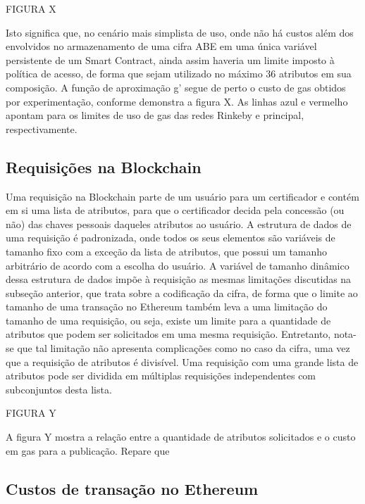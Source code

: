 \documentclass[a4paper,11pt]{article}
\begin{document}
FIGURA X

Isto significa que, no cenário mais simplista de uso, onde não há custos além dos envolvidos no armazenamento de uma cifra ABE em uma única variável persistente de um Smart Contract, ainda assim haveria um limite imposto à política de acesso, de forma que sejam utilizado no máximo 36 atributos em sua composição.
A função de aproximação g' segue de perto o custo de gas obtidos por experimentação, conforme demonstra a figura X.
As linhas azul e vermelho apontam para os limites de uso de gas das redes Rinkeby e principal, respectivamente.


\subsection{Requisições na Blockchain}
\label{sec:sub:experimento-requisicoes}

Uma requisição na Blockchain parte de um usuário para um certificador e contém em si uma lista de atributos, para que o certificador decida pela concessão (ou não) das chaves pessoais daqueles atributos ao usuário.
A estrutura de dados de uma requisição é padronizada, onde todos os seus elementos são variáveis de tamanho fixo com a exceção da lista de atributos, que possui um tamanho arbitrário de acordo com a escolha do usuário.
A variável de tamanho dinâmico dessa estrutura de dados impõe à requisição as mesmas limitações discutidas na subseção anterior, que trata sobre a codificação da cifra, de forma que o limite ao tamanho de uma transação no Ethereum também leva a uma limitação do tamanho de uma requisição, ou seja, existe um limite para a quantidade de atributos que podem ser solicitados em uma mesma requisição.
Entretanto, nota-se que tal limitação não apresenta complicações como no caso da cifra, uma vez que a requisição de atributos é divisível.
Uma requisição com uma grande lista de atributos pode ser dividida em múltiplas requisições independentes com subconjuntos desta lista.

FIGURA Y

A figura Y mostra a relação entre a quantidade de atributos solicitados e o custo em gas para a publicação.
Repare que


\subsection{Custos de transação no Ethereum}
\label{sec:sub:experimento-custos}
\end{document}
